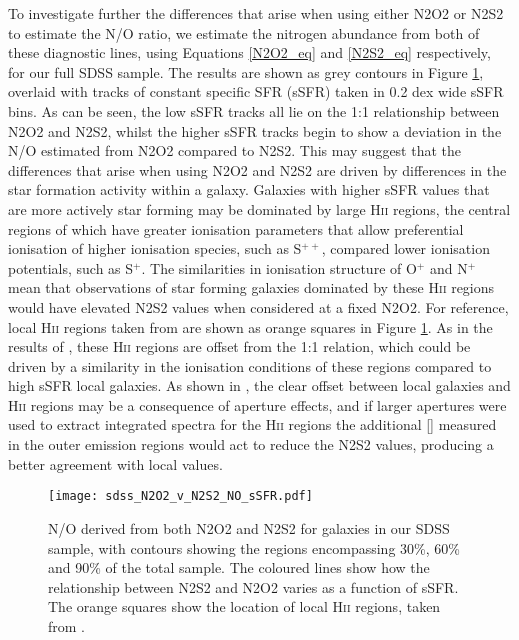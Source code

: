 \documentclass[usenatbib]{mnras} %
\begin{document}
To investigate further the differences that arise when using either N2O2 or N2S2 to estimate the N/O ratio, we estimate the nitrogen abundance from both of these diagnostic lines, using Equations \ref{N2O2_eq} and \ref{N2S2_eq} respectively, for our full SDSS sample. The results are shown as grey contours in Figure \ref{fig:NO_diag_sSFR}, overlaid with tracks of constant specific SFR (sSFR) taken in 0.2 dex wide sSFR bins. As can be seen, the low sSFR tracks all lie on the 1:1 relationship between N2O2 and N2S2, whilst the higher sSFR tracks begin to show a deviation in the N/O estimated from N2O2 compared to N2S2. This may suggest that the differences that arise when using N2O2 and N2S2 are driven by differences in the star formation activity within a galaxy. Galaxies with higher sSFR values that are more actively star forming may be dominated by large \textsc{Hii} regions, the central regions of which have greater ionisation parameters that allow preferential ionisation of higher ionisation species, such as S$^{++}$, compared lower ionisation potentials, such as S$^+$. The similarities in ionisation structure of O$^+$ and N$^+$ mean that observations of star forming galaxies dominated by these \textsc{Hii} regions would have elevated N2S2 values when considered at a fixed N2O2. For reference, local \textsc{Hii} regions taken from \cite{Pilyugin_2012} are shown as orange squares in Figure \ref{fig:NO_diag_sSFR}. As in the results of \cite{Strom_2018}, these \textsc{Hii} regions are offset from the 1:1 relation, which could be driven by a similarity in the ionisation conditions of these regions compared to high sSFR local galaxies. As shown in \cite{Mannucci_2021}, the clear offset between local galaxies and \textsc{Hii} regions may be a consequence of aperture effects, and if larger apertures were used to extract integrated spectra for the \textsc{Hii} regions the additional [] measured in the outer emission regions would act to reduce the N2S2 values, producing a better agreement with local values.

\begin{figure}
\texttt{[image: sdss\_N2O2\_v\_N2S2\_NO\_sSFR.pdf]}
\caption{N/O derived from both N2O2 and N2S2 for galaxies in our SDSS sample, with contours showing the regions encompassing 30\%, 60\% and 90\% of the total sample. The coloured lines show how the relationship between N2S2 and N2O2 varies as a function of sSFR. The orange squares show the location of local \textsc{Hii} regions, taken from \citet{Pilyugin_2012}.}
\label{fig:NO_diag_sSFR}
\end{figure}




\bsp	%
\label{lastpage}
\end{document}
